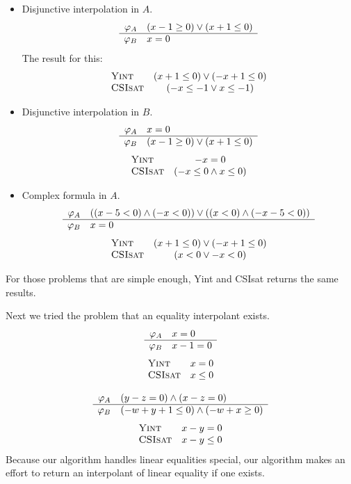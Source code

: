 \begin{itemize}
\item Disjunctive interpolation in $A$.
\[\begin{array}{r l}
\varphi_A & (x-1 \geq 0) \vee (x+1 \leq 0) \\
\hline
\varphi_B & x=0
\end{array}\]
The result for this:
\[\begin{array}{l c}
\text{\textsc{Yint}} & (x+1 \leq 0) \vee (-x+1 \leq 0) \\
\text{\textsc{CSIsat}} & (-x \leq -1 \vee x \leq -1)
\end{array}\]
\item Disjunctive interpolation in $B$.
\[\begin{array}{r l}
\varphi_A & x=0 \\
\hline
\varphi_B & (x-1 \geq 0) \vee (x+1 \leq 0)
\end{array}\]
\[\begin{array}{l c}
\text{\textsc{Yint}} & -x=0 \\
\text{\textsc{CSIsat}} & (-x \leq 0 \wedge x \leq 0)
\end{array}\]
\item Complex formula in $A$.
\[\begin{array}{r l}
\varphi_A & ((x-5<0) \wedge (-x<0)) \vee ((x<0) \wedge (-x-5<0)) \\
\hline
\varphi_B & x=0
\end{array}\]
\[\begin{array}{l c}
\text{\textsc{Yint}} & (x+1 \leq 0) \vee (-x+1 \leq 0) \\
\text{\textsc{CSIsat}} & (x < 0 \vee -x < 0)
\end{array}\]
\end{itemize}
For those problems that are simple enough, Yint and CSIsat returns the
same results.

Next we tried the problem that an equality interpolant exists.
\[\begin{array}{r l}
\varphi_A & x=0 \\
\hline
\varphi_B & x-1=0
\end{array}\]
\[\begin{array}{l c}
\text{\textsc{Yint}} & x=0 \\
\text{\textsc{CSIsat}} & x \leq 0
\end{array}\]

\bigskip\centerline{}

\[\begin{array}{r l}
\varphi_A & (y-z=0) \wedge (x-z=0) \\
\hline
\varphi_B & (-w+y+1 \leq 0) \wedge (-w+x \geq 0)
\end{array}\]
\[\begin{array}{l c}
\text{\textsc{Yint}} & x-y=0 \\
\text{\textsc{CSIsat}} & x-y \leq 0
\end{array}\]
Because our algorithm handles linear equalities special, our algorithm
makes an effort to return an interpolant of linear equality if one
exists.

